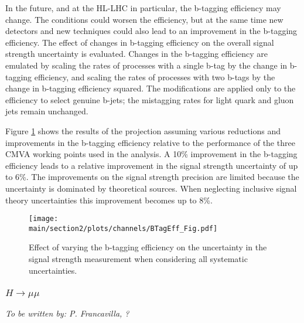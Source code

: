 In the future, and at the HL-LHC in particular, the b-tagging efficiency may change. The conditions could worsen the efficiency, but
at the same time new detectors and new techniques could also lead to an improvement in the b-tagging efficiency. 
The effect of changes in b-tagging efficiency on the overall signal strength uncertainty is evaluated. Changes in the b-tagging
efficiency are emulated by scaling the rates of processes with a single b-tag by the change in b-tagging efficiency, and scaling the 
rates of processes with two b-tags by the change in b-tagging efficiency squared. The modifications are applied only to the efficiency to select genuine b-jets; the mistagging rates for light quark and gluon jets remain unchanged.

Figure \ref{fig:vhbb_btageff} shows the results of the projection assuming various reductions and improvements in the b-tagging efficiency relative to the performance of the three CMVA working points used in the analysis.
A 10\% improvement in the b-tagging efficiency leads to a relative improvement in the signal strength uncertainty of up to 6\%. The improvements on the signal strength precision are limited because the uncertainty is dominated by theoretical sources. When neglecting inclusive signal theory uncertainties this improvement becomes up to 8\%. 


\begin{figure}[h!]
\begin{center}
\texttt{[image: \\main/section2/plots/channels/BTagEff\_Fig.pdf]}
\end{center}
\caption{Effect of varying the b-tagging efficiency on the uncertainty in the signal strength measurement when considering all systematic uncertainties.}
\label{fig:vhbb_btageff}
\end{figure}

\subsubsection{$H \to \mu\mu$}
{\it To be written by: P. Francavilla, ?}
